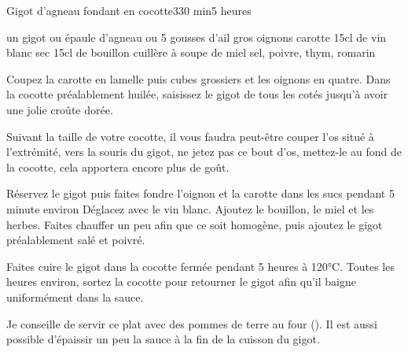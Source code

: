 \begin{recette}{Gigot d'agneau fondant en cocotte}{3}{30 min}{5 heures}
\begin{ingredients}
\ingredient un gigot ou épaule d'agneau
 ou 5 gousses d'ail
 gros oignons
 carotte
\ingredient 15cl de vin blanc sec
\ingredient 15cl de bouillon
 cuillère à soupe de miel
\ingredient sel, poivre, thym, romarin
\end{ingredients}


\begin{preparation}
\etape Coupez la carotte en lamelle puis cubes grossiers et les oignons en quatre.
\etape Dans la cocotte préalablement huilée, saisissez le gigot de tous les cotés jusqu'à avoir une jolie croûte dorée.
\begin{remarque}
Suivant la taille de votre cocotte, il vous faudra peut-être couper l'os situé à l'extrémité, vers la souris du gigot, ne jetez pas ce bout d'os, mettez-le au fond de la cocotte, cela apportera encore plus de goût.
\end{remarque}
\etape Réservez le gigot puis faites fondre l'oignon et la carotte dans les sucs pendant 5 minute environ
\etape Déglacez avec le vin blanc. Ajoutez le bouillon, le miel et les herbes. Faites chauffer un peu afin que ce soit homogène, puis ajoutez le gigot préalablement salé et poivré. 
\end{preparation}

\begin{cuisson}
Faites cuire le gigot dans la cocotte fermée pendant 5 heures à 120°C. Toutes les heures environ, sortez la cocotte pour retourner le gigot afin qu'il baigne uniformément dans la sauce.

Je conseille de servir ce plat avec des pommes de terre au four (). Il est aussi possible d'épaissir un peu la sauce à la fin de la cuisson du gigot. 
\end{cuisson}

\end{recette}

